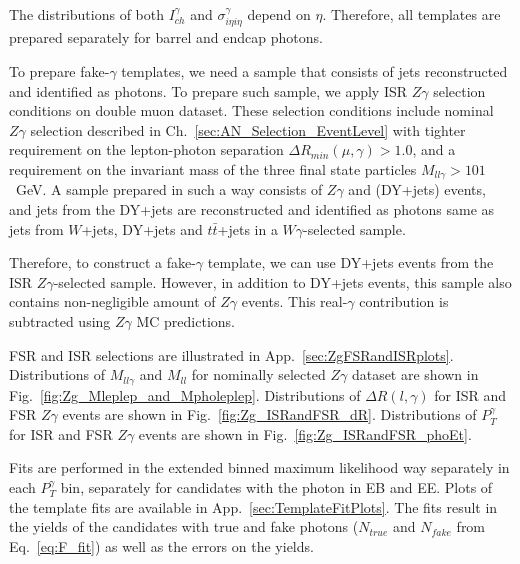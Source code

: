 The distributions of both $I_{ch}^{\gamma}$ and $\sigma_{i\eta i\eta}^{\gamma}$ depend on $\eta$. Therefore, all templates are prepared separately for barrel and endcap photons.

To prepare fake-$\gamma$ templates, we need a sample that consists of jets reconstructed and identified as photons. To prepare such sample, we apply ISR $Z\gamma$ selection conditions on double muon dataset. These selection conditions include nominal $Z\gamma$ selection described in Ch.~\ref{sec:AN_Selection_EventLevel} with tighter requirement on the lepton-photon separation $\Delta{R_{min}}(\mu,\gamma)>1.0$, and a requirement on the invariant mass of the three final state particles $M_{ll\gamma}>101$~GeV. A sample prepared in such a way consists of $Z\gamma$ and (DY+jets) events, and jets from the DY+jets are reconstructed and identified as photons same as jets from $W$+jets, DY+jets and $t\bar{t}$+jets in a $W\gamma$-selected sample. 

Therefore, to construct a fake-$\gamma$ template, we can use DY+jets events from the ISR $Z\gamma$-selected sample. However, in addition to DY+jets events, this sample also contains non-negligible amount of $Z\gamma$ events. This real-$\gamma$ contribution is subtracted using $Z\gamma$ MC predictions.

FSR and ISR selections are illustrated in App.~\ref{sec:ZgFSRandISRplots}. Distributions of $M_{ll\gamma}$ and $M_{ll}$ for nominally selected $Z\gamma$ dataset are shown in Fig.~\ref{fig:Zg_Mleplep_and_Mpholeplep}. Distributions of $\Delta{R}(l,\gamma)$ for ISR and FSR $Z\gamma$ events are shown in Fig.~\ref{fig:Zg_ISRandFSR_dR}. Distributions of $P_{T}^{\gamma}$ for ISR and FSR $Z\gamma$ events are shown in Fig.~\ref{fig:Zg_ISRandFSR_phoEt}. 

Fits are performed in the extended binned maximum likelihood way separately in each $P_T^{\gamma}$ bin, separately for candidates with the photon in EB and EE. Plots of the template fits are available in App.~\ref{sec:TemplateFitPlots}. The fits result in the yields of the candidates with true and fake photons ($N_{true}$ and $N_{fake}$ from Eq.~\ref{eq:F_fit}) as well as the errors on the yields.

